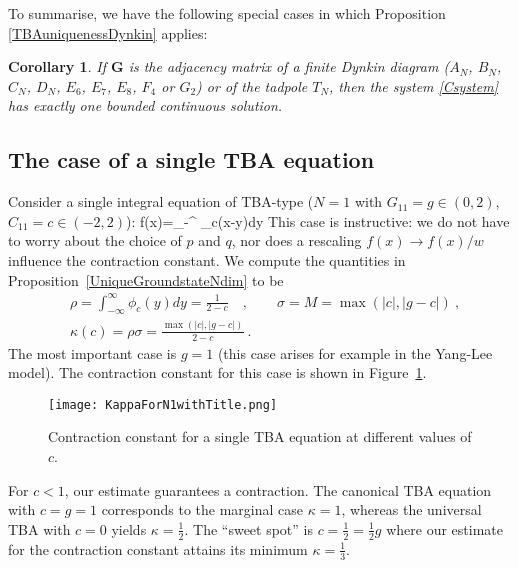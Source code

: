 \documentclass[12pt]{article}
\theoremstyle{plain}
\newtheorem{corollary}[theorem]{Corollary}
\theoremstyle{definition}
\numberwithin{equation}{section}
\numberwithin{theorem}{section}
\def\be#1\ee{\begin{equation}#1\end{equation}}
\renewcommand{\vec}[1]{\mathbf{#1}}
\begin{document}
To summarise, we have the following special cases in which Proposition \ref{TBAuniquenessDynkin} applies:

\begin{corollary} 
If $\vec{G}$ is the adjacency matrix of a finite
Dynkin diagram
($A_N$, $B_N$, $C_N$, $D_N$, $E_6$, $E_7$, $E_8$, $F_4$ or $G_2$)
or of the tadpole $T_N$, 
then the system \eqref{Csystem} has exactly one bounded continuous solution.
\end{corollary}



\subsection{The case of a  single TBA equation}\label{N=1-example-section}


Consider a single integral equation of TBA-type ($N=1$ with 
	$G_{11} = g\in(0,2)$, 
$C_{11} = c\in(-2,2)$): 
\be\label{TBAforN1}
f(x)=\int_{-\infty}^{\infty} \phi_c(x-y) dy
\ee
This case is instructive: we do not have to worry about the choice of $p$ and $q$, nor does a rescaling $f(x)\rightarrow f(x)/w$ influence the contraction constant.
We compute the quantities in Proposition~\ref{UniqueGroundstateNdim} to be
\begin{align}
&\rho = \int_{-\infty}^\infty \phi_c(y)dy = \frac{1}{2-c}
\quad , \qquad
\sigma = M = \max(|c|, |g-c|) \ ,\nonumber\\
&\kappa(c) = \rho\sigma =\frac{\max(|c|, |g-c|)}{2-c} \ .
\end{align} 
The most important case is $g=1$ (this case arises for example in the Yang-Lee model). The contraction constant for this case is shown in Figure~\ref{kappaofc}.

\begin{figure}
\begin{center}
\texttt{[image: KappaForN1withTitle.png]}
\caption{Contraction constant for a single TBA equation at different values of $c$.}
\label{kappaofc}
\end{center}
\end{figure}

For $c<1$, our estimate guarantees a contraction. 
The canonical TBA equation with $c=g=1$ corresponds to the marginal case $\kappa=1$, whereas the universal TBA with $c=0$ yields $\kappa=\tfrac{1}{2}$. The ``sweet spot'' is $c=\tfrac{1}{2}=\tfrac{1}{2}g$ where our estimate for the contraction constant
attains its minimum $\kappa=\tfrac{1}{3}$.
\end{document}
